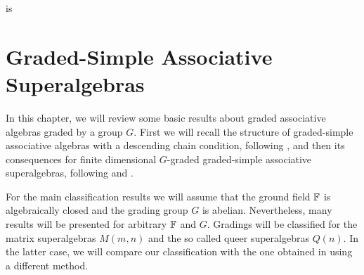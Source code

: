 is \chapter{Graded-Simple Associative Superalgebras}\label{chap:grd-simple-assc}

In this chapter, we will review some basic results about graded associative algebras graded by a group $G$.
First we will recall the structure of graded-simple associative algebras with a descending chain condition, following \cite{livromicha}, and then its consequences for finite dimensional $G$-graded graded-simple associative superalgebras, following \cite{paper-MAP} and \cite{Helens_thesis}. 

For the main classification results we will assume that the ground field $\mathbb{F}$ is algebraically closed and the grading group $G$ is abelian. 
Nevertheless, many results will be presented for arbitrary $\mathbb{F}$ and $G$. 
Gradings will be classified for the matrix superalgebras $M(m,n)$ and the so called queer superalgebras $Q(n)$. 
In the latter case, we will compare our classification with the one obtained in \cite{paper-Qn} using a different method.






